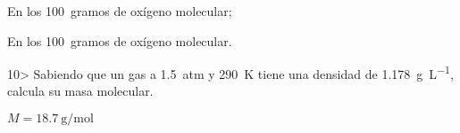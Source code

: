 \documentclass{article}
\begin{document}
\begin{multicols}{2}
\begin{solution}
  \begin{enumerate*}
    \item En los \SI{100}{gramos} de oxígeno molecular;
    \item En los \SI{100}{gramos} de oxígeno molecular.
  \end{enumerate*}
\end{solution}

\begin{exercise}
  10> Sabiendo que un gas a \SI{1,5}{atm} y \SI{290}{\kelvin} tiene una densidad de \SI{1,178}{\gram\per\liter}, calcula su masa molecular.
\end{exercise}
\begin{solution}
  $M = \SI{18,7}{\gram\per\mole}$
\end{solution}


\end{multicols}
\end{document}
